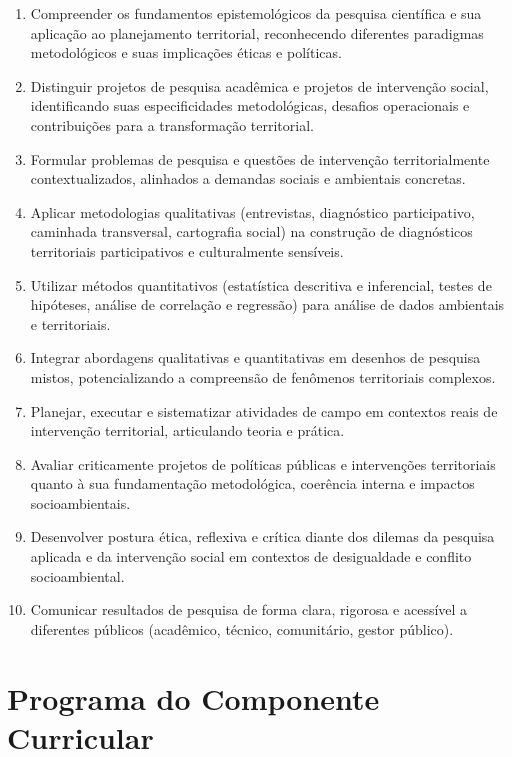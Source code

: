 \documentclass[11pt,a4paper]{article}
\begin{document}
\begin{enumerate}
\item Compreender os fundamentos epistemológicos da pesquisa científica e sua aplicação ao planejamento territorial, reconhecendo diferentes paradigmas metodológicos e suas implicações éticas e políticas.
\item Distinguir projetos de pesquisa acadêmica e projetos de intervenção social, identificando suas especificidades metodológicas, desafios operacionais e contribuições para a transformação territorial.
\item Formular problemas de pesquisa e questões de intervenção territorialmente contextualizados, alinhados a demandas sociais e ambientais concretas.
\item Aplicar metodologias qualitativas (entrevistas, diagnóstico participativo, caminhada transversal, cartografia social) na construção de diagnósticos territoriais participativos e culturalmente sensíveis.
\item Utilizar métodos quantitativos (estatística descritiva e inferencial, testes de hipóteses, análise de correlação e regressão) para análise de dados ambientais e territoriais.
\item Integrar abordagens qualitativas e quantitativas em desenhos de pesquisa mistos, potencializando a compreensão de fenômenos territoriais complexos.
\item Planejar, executar e sistematizar atividades de campo em contextos reais de intervenção territorial, articulando teoria e prática.
\item Avaliar criticamente projetos de políticas públicas e intervenções territoriais quanto à sua fundamentação metodológica, coerência interna e impactos socioambientais.
\item Desenvolver postura ética, reflexiva e crítica diante dos dilemas da pesquisa aplicada e da intervenção social em contextos de desigualdade e conflito socioambiental.
\item Comunicar resultados de pesquisa de forma clara, rigorosa e acessível a diferentes públicos (acadêmico, técnico, comunitário, gestor público).
\end{enumerate}

\section*{Programa do Componente Curricular}
\end{document}
